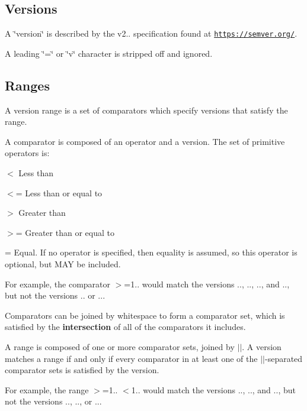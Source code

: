 \subsection*{Versions}

A \char`\"{}version\char`\"{} is described by the {\ttfamily v2..} specification found at \href{https://semver.org/}{\tt https\+://semver.\+org/}.

A leading {\ttfamily \char`\"{}=\char`\"{}} or {\ttfamily \char`\"{}v\char`\"{}} character is stripped off and ignored.

\subsection*{Ranges}

A {\ttfamily version range} is a set of {\ttfamily comparators} which specify versions that satisfy the range.

A {\ttfamily comparator} is composed of an {\ttfamily operator} and a {\ttfamily version}. The set of primitive {\ttfamily operators} is\+:


\begin{DoxyItemize}
\item {\ttfamily $<$} Less than
\item {\ttfamily $<$=} Less than or equal to
\item {\ttfamily $>$} Greater than
\item {\ttfamily $>$=} Greater than or equal to
\item {\ttfamily =} Equal. If no operator is specified, then equality is assumed, so this operator is optional, but M\+AY be included.
\end{DoxyItemize}

For example, the comparator {\ttfamily $>$=1..} would match the versions {..}, {..}, {..}, and {..}, but not the versions {..} or {..}.

Comparators can be joined by whitespace to form a {\ttfamily comparator set}, which is satisfied by the {\bfseries intersection} of all of the comparators it includes.

A range is composed of one or more comparator sets, joined by {\ttfamily $\vert$$\vert$}. A version matches a range if and only if every comparator in at least one of the {\ttfamily $\vert$$\vert$}-\/separated comparator sets is satisfied by the version.

For example, the range {\ttfamily $>$=1.. $<$1..} would match the versions {..}, {..}, and {..}, but not the versions {..}, {..}, or {..}.

